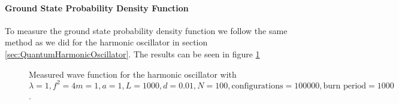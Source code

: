 \documentclass[12pt]{article}
\begin{document}
            \paragraph{Ground State Probability Density Function}
                To measure the ground state probability density function we follow the same method as we did for the harmonic oscillator in section \ref{sec:QuantumHarmonicOscillator}. The results can be seen in figure \ref{fig:AnharmonicWaveFunction}
                \begin{figure}
                    \centering
                    \caption{Measured wave function for the harmonic oscillator with $\lambda = 1, f^2=4 m = 1, a = 1, L = 1000, d = 0.01, N = 100, \text{configurations} = 100000, \text{burn period} = 1000$.}
                    \label{fig:AnharmonicWaveFunction}
                \end{figure}
\end{document}
